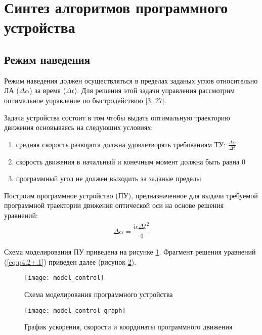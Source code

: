 \section{Синтез алгоритмов программного устройства} \label{ch:ch4/sect2+}

\subsection{Режим наведения} \label{subsec:ch4/sect2/sub1}

Режим наведения должен осуществляться в пределах заданых углов относительно ЛА ($\varDelta\alpha$) за время ($\varDelta t$). Для решения этой задачи управления рассмотрим оптимальное управление по быстродействию [3, 27].

Задача устройства состоит в том чтобы выдать оптимальную траекторию движения основываясь на следующих условиях:
\begin{enumerate}
	\item средняя скорость разворота должна удовлетворять требованиям ТУ: 
	$\frac{\varDelta\alpha}{\varDelta t}$
	\item скорость движения в начальный и конечным момент должна быть равна 0
	\item программный угол не должен выходить за заданые пределы
\end{enumerate}

Построим программное устройство (ПУ), предназначенное для выдачи требуемой программной траектории движения оптической оси на основе решения уравнений:
\begin{equation}
\label{eq:p4:2+.1}
\begin{alignedat}{2}
\varDelta\alpha = \dfrac{\ddot{\alpha}{\varDelta t}^2}{4}
\end{alignedat}
\end{equation}

Схема моделирования ПУ приведена на рисунке \ref{fig:model_control}. Фрагмент решения уравнений (\ref{eq:p4:2+.1}) приведен далее (рисунок \ref{fig:model_control_graph}).

\begin{figure}[ht]
	\centering
	\texttt{[image: model\_control]} 
	\caption{Схема моделирования программного устройства}
	\label{fig:model_control}
\end{figure}



\begin{figure}
	\centering
	\texttt{[image: model\_control\_graph]}
	\caption{График ускорения, скорости и координаты программного движения}
	\label{fig:model_control_graph}
\end{figure}


